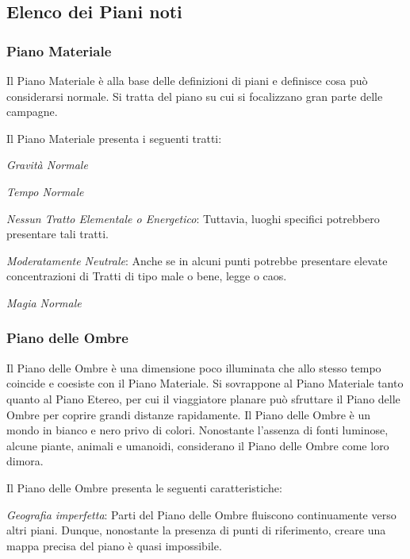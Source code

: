 \documentclass[a4paper,twoside,openany]{book}
\begin{document}
\begin{multicols}{2}


\subsection{Elenco dei Piani noti}

\subsubsection{Piano Materiale}\label{pianomateriale}
Il Piano Materiale è alla base delle definizioni di piani e definisce cosa può considerarsi normale. Si tratta del piano su cui si focalizzano gran parte delle campagne.

Il Piano Materiale presenta i seguenti tratti:

\noindent\emph{Gravità Normale}

\noindent\emph{Tempo Normale}

\noindent\emph{Nessun Tratto Elementale o Energetico}: Tuttavia, luoghi specifici potrebbero presentare tali tratti.

\noindent\emph{Moderatamente Neutrale}: Anche se in alcuni punti potrebbe presentare elevate concentrazioni di Tratti di tipo male o bene, legge o caos.

\noindent\emph{Magia Normale}

\subsubsection{Piano delle Ombre}\label{pianoombre}
Il Piano delle Ombre è una dimensione poco illuminata che allo stesso tempo coincide e coesiste con il Piano Materiale. Si sovrappone al Piano Materiale tanto quanto al Piano Etereo, per cui il viaggiatore planare può sfruttare il Piano delle Ombre per coprire grandi distanze rapidamente. Il Piano delle Ombre è un mondo in bianco e nero privo di colori. Nonostante l'assenza di fonti luminose, alcune piante, animali e umanoidi, considerano il Piano delle Ombre come loro dimora.

Il Piano delle Ombre presenta le seguenti caratteristiche:

\emph{Geografia imperfetta}: Parti del Piano delle Ombre fluiscono continuamente verso altri piani. Dunque, nonostante la presenza di punti di riferimento, creare una mappa precisa del piano è quasi impossibile.


\end{multicols}
\end{document}
